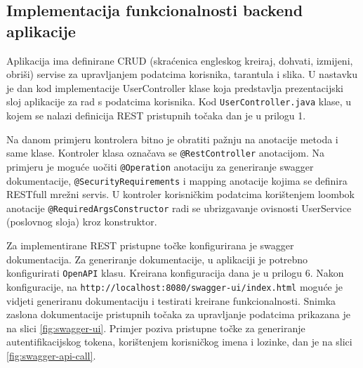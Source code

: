 \documentclass[a4paper,12pt,oneside]{article}
\begin{document}
\subsection{Implementacija funkcionalnosti backend aplikacije}

Aplikacija ima definirane CRUD (skraćenica engleskog kreiraj, dohvati, izmijeni, obriši) servise za upravljanjem podatcima korisnika, tarantula i slika. U nastavku je dan kod implementacije UserController klase koja predstavlja prezentacijski sloj aplikacije za rad s podatcima korisnika. Kod \texttt{UserController.java} klase, u kojem se nalazi definicija REST pristupnih točaka dan je u prilogu 1.




Na danom primjeru kontrolera bitno je obratiti pažnju na anotacije metoda i same klase. Kontroler klasa označava se \texttt{@RestController} anotacijom. Na primjeru je moguće uočiti \texttt{@Operation} anotaciju za generiranje swagger dokumentacije, \texttt{@SecurityRequirements} i mapping anotacije kojima se definira RESTfull mrežni servis. U kontroler korisničkim podatcima korištenjem loombok anotacije \texttt{@RequiredArgsConstructor} radi se ubrizgavanje ovisnosti UserService (poslovnog sloja) kroz konstruktor.

Za implementirane REST pristupne točke konfigurirana je swagger dokumentacija. Za generiranje dokumentacije, u aplikaciji je potrebno konfigurirati \texttt{OpenAPI} klasu. Kreirana konfiguracija dana je u prilogu 6. Nakon konfiguracije, na \texttt{http://localhost:8080/swagger-ui\-/index.html} moguće je vidjeti generiranu dokumentaciju i testirati kreirane funkcionalnosti. Snimka zaslona dokumentacije pristupnih točaka za upravljanje podatcima prikazana je na slici \ref{fig:swagger-ui}. Primjer poziva pristupne točke za generiranje autentifikacijskog tokena, korištenjem korisničkog imena i lozinke, dan je na slici \ref{fig:swagger-api-call}.
\end{document}

